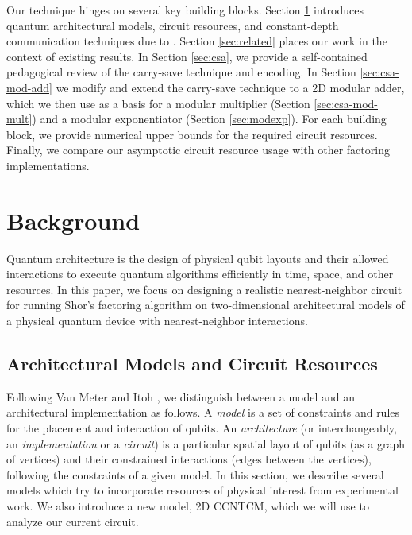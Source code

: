 Our technique hinges on several key building blocks.
Section \ref{sec:bg} introduces quantum architectural models, circuit
resources, and constant-depth communication techniques due to
\cite{Harrow2012,Rosenbaum2012}.
Section \ref{sec:related} places our work in the context of existing
results.
In Section \ref{sec:csa}, we provide a self-contained pedagogical review
of the carry-save technique and encoding.
In Section \ref{sec:csa-mod-add} we modify and extend the carry-save technique to a 2D
modular adder,
which we then use as a basis for a modular multiplier
(Section \ref{sec:csa-mod-mult}) and a modular exponentiator
(Section \ref{sec:modexp}).
For each building block, we provide numerical upper bounds for the
required circuit resources.
Finally, we compare our asymptotic circuit resource usage
with other factoring implementations.

%
\section{Background}
\label{sec:bg}

Quantum architecture is the design of physical qubit layouts
and their allowed interactions to execute
quantum algorithms efficiently in time, space, and other
resources.
In this paper, we focus on designing a realistic nearest-neighbor circuit for running
Shor's factoring algorithm on two-dimensional
architectural models of a physical quantum device with nearest-neighbor
interactions.

\subsection{Architectural Models and Circuit Resources}
\label{subsec:models}

Following Van Meter and Itoh \cite{VanMeter2005},
we distinguish between a model and an architectural implementation as follows.
A \emph{model} is a set of constraints and rules for the placement and
interaction of qubits.
An \emph{architecture} (or interchangeably, an \emph{implementation} 
or a \emph{circuit}) is a particular
spatial layout of qubits (as a graph of vertices) and their
constrained interactions (edges between the vertices),
following the constraints of a given model. In this section, we describe
several models which try to incorporate resources of physical interest from
experimental work. We also introduce a new model,
\textsc{2D CCNTCM}, which we will use to analyze our current circuit.

